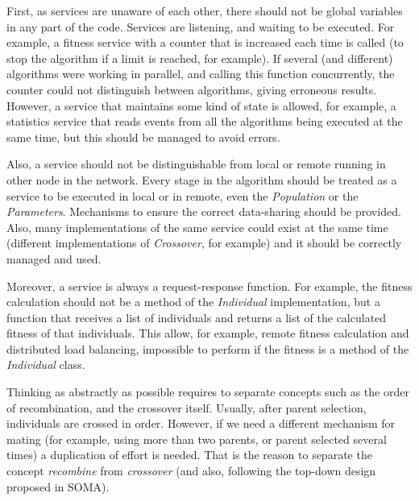 First, as services are unaware of each other, there should not be global
variables in any part of the code. Services are listening, and waiting
to be executed. For example, a fitness service with a counter that is
increased each time is called (to stop the algorithm if a limit is
reached, for example). If several (and different) algorithms were
working in parallel, and calling this function concurrently, the
counter could not distinguish between algorithms, giving erroneous
results. However, a service that maintains some kind of state is
allowed, for example, a statistics service that reads events from all
the algorithms being executed at the same time, but this should be
managed to avoid errors. %

Also, a service should not be distinguishable from local or remote
running in other node in the network. %
Every stage in the algorithm should be treated as a service to be
executed in local or in remote, even the {\em Population} or the {\em
  Parameters}. Mechanisms to ensure the correct data-sharing should be
provided. Also, many implementations of the same service could exist
at the same time (different implementations of {\em Crossover}, for
example) and it should be correctly managed and used. %

Moreover, a service is always a request-response function. For
example, the fitness calculation should not be a method of the {\em
  Individual} implementation, but a function that receives a list of
individuals and returns a list of the calculated fitness of that
individuals. This allow, for example, remote fitness calculation and
distributed load balancing, impossible to perform if the fitness is a
method of the {\em Individual} class. %

Thinking as abstractly as possible requires to separate concepts such as
the order of recombination, and the crossover itself. Usually, after
parent selection, individuals are crossed in order. However, if we
need a different mechanism for mating (for example, using more than
two parents, or parent selected several times) a duplication of effort
is needed. That is the reason to separate the concept {\em
  recombine} from {\em crossover} (and also, following the top-down
design proposed in SOMA).  %

